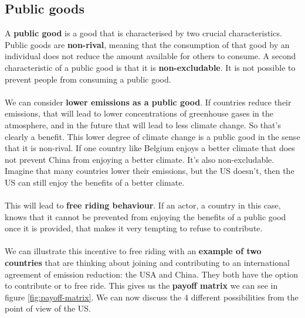 \documentclass[../summary.tex]{subfiles}
\begin{document}
\newpage
\subsection{Public goods}

A \textbf{public good} is a good that is characterised by two crucial characteristics. Public goods are \textbf{non-rival}, meaning that the consumption of that good by an individual does not reduce the amount available for others to consume. A second characteristic of a public good is that it is \textbf{non-excludable}. It is not possible to prevent people from consuming a public good.
\\\\
We can consider \textbf{lower emissions as a public good}. If countries reduce their emissions, that will lead to lower concentrations of greenhouse gases in the atmosphere, and in the future that will lead to less climate change. So that's clearly a benefit. This lower degree of climate change is a public good in the sense that it is non-rival. If one country like Belgium enjoys a better climate that does not prevent China from enjoying a better climate. It's also non-excludable. Imagine that many countries lower their emissions, but the US doesn't, then the US can still enjoy the benefits of a better climate.
\\\\
This will lead to \textbf{free riding behaviour}. If an actor, a country in this case, knows that it cannot be prevented from enjoying the benefits of a public good once it is provided, that makes it very tempting to refuse to contribute.
\\\\
We can illustrate this incentive to free riding with an \textbf{example of two countries} that are thinking about joining and contributing to an international agreement of emission reduction: the USA and China. They both have the option to contribute or to free ride. This gives us the \textbf{payoff matrix} we can see in figure \ref{fig:payoff-matrix}. We can now discuss the 4 different possibilities from the point of view of the US.
\end{document}
